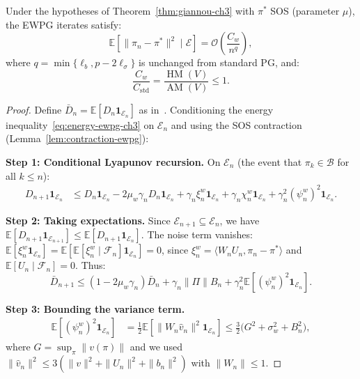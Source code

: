 \begin{theorem}
\label{thm:ewpg-conv-ch3}
Under the hypotheses of Theorem~\ref{thm:giannou-ch3} with $\pi^*$ SOS (parameter $\mu$), the EWPG iterates satisfy:
\begin{equation}
    \mathbb{E}[\|\pi_n - \pi^*\|^2 \mid \mathcal{E}] = \mathcal{O}\!\left(\frac{C_w}{n^q}\right),
\end{equation}
where $q = \min\{\ell_b, p - 2\ell_\sigma\}$ is unchanged from standard PG, and:
\begin{equation}
\label{eq:constant-improvement}
    \frac{C_w}{C_{\mathrm{std}}} = \frac{\operatorname{HM}(V)}{\operatorname{AM}(V)} \leq 1.
\end{equation}
\end{theorem}

\begin{proof}
Define $\bar{D}_n = \mathbb{E}[D_n \mathbf{1}_{\mathcal{E}_n}]$ as in~\cite{giannou2022}. Conditioning the energy inequality~\eqref{eq:energy-ewpg-ch3} on $\mathcal{E}_n$ and using the SOS contraction (Lemma~\ref{lem:contraction-ewpg}):

\textbf{Step 1: Conditional Lyapunov recursion.}
On $\mathcal{E}_n$ (the event that $\pi_k \in \mathcal{B}$ for all $k \leq n$):
\begin{align}
    D_{n+1} \mathbf{1}_{\mathcal{E}_n} &\leq D_n \mathbf{1}_{\mathcal{E}_n} - 2\mu_w \gamma_n D_n \mathbf{1}_{\mathcal{E}_n} + \gamma_n \xi_n^w \mathbf{1}_{\mathcal{E}_n} + \gamma_n \chi_n^w \mathbf{1}_{\mathcal{E}_n} + \gamma_n^2 (\psi_n^w)^2 \mathbf{1}_{\mathcal{E}_n}. \label{eq:cond-lyap}
\end{align}

\textbf{Step 2: Taking expectations.}
Since $\mathcal{E}_{n+1} \subseteq \mathcal{E}_n$, we have $\mathbb{E}[D_{n+1} \mathbf{1}_{\mathcal{E}_{n+1}}] \leq \mathbb{E}[D_{n+1} \mathbf{1}_{\mathcal{E}_n}]$. The noise term vanishes: $\mathbb{E}[\xi_n^w \mathbf{1}_{\mathcal{E}_n}] = \mathbb{E}[\mathbb{E}[\xi_n^w \mid \mathcal{F}_n] \mathbf{1}_{\mathcal{E}_n}] = 0$, since $\xi_n^w = \langle W_n U_n, \pi_n - \pi^* \rangle$ and $\mathbb{E}[U_n \mid \mathcal{F}_n] = 0$. Thus:
\begin{equation}
    \bar{D}_{n+1} \leq (1 - 2\mu_w \gamma_n) \bar{D}_n + \gamma_n \|\Pi\| B_n + \gamma_n^2 \mathbb{E}[(\psi_n^w)^2 \mathbf{1}_{\mathcal{E}_n}]. \label{eq:Dbar-recursion}
\end{equation}

\textbf{Step 3: Bounding the variance term.}
\begin{align}
    \mathbb{E}[(\psi_n^w)^2 \mathbf{1}_{\mathcal{E}_n}] &= \tfrac{1}{2}\mathbb{E}[\|W_n \hat{v}_n\|^2 \mathbf{1}_{\mathcal{E}_n}] \leq \tfrac{3}{2}\bigl(G^2 + \sigma_w^2 + B_n^2\bigr), \label{eq:psi-bound}
\end{align}
where $G = \sup_\pi \|v(\pi)\|$ and we used $\|\hat{v}_n\|^2 \leq 3(\|v\|^2 + \|U_n\|^2 + \|b_n\|^2)$ with $\|W_n\| \leq 1$.


\end{proof}
